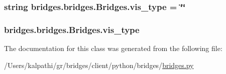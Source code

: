 \subsubsection[{vis\+\_\+type}]{\setlength{\rightskip}{0pt plus 5cm}string bridges.\+bridges.\+Bridges.\+vis\+\_\+type = \char`\"{}\char`\"{}\hspace{0.3cm}{\ttfamily [static]}}\label{classbridges_1_1bridges_1_1_bridges_a7eceb4799ff2849276f226d3f229db62}
\hypertarget{classbridges_1_1bridges_1_1_bridges_a5ca152bf3830e2be1f72247463916f82}{}
\subsubsection[{vis\+\_\+type}]{\setlength{\rightskip}{0pt plus 5cm}bridges.\+bridges.\+Bridges.\+vis\+\_\+type}\label{classbridges_1_1bridges_1_1_bridges_a5ca152bf3830e2be1f72247463916f82}


The documentation for this class was generated from the following file\+:\begin{DoxyCompactItemize}
\item 
/\+Users/kalpathi/gr/bridges/client/python/bridges/\hyperlink{bridges_8py}{bridges.\+py}\end{DoxyCompactItemize}
